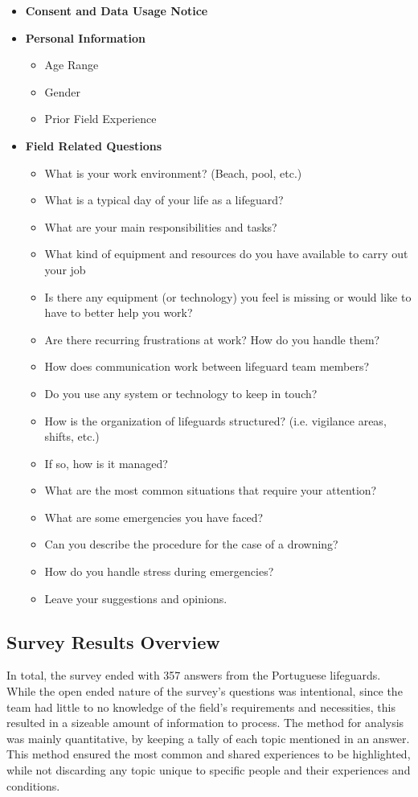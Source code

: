 \begin{itemize}
    \item \textbf{Consent and Data Usage Notice}
    \item \textbf{Personal Information}
    \begin{itemize}
        \item Age Range
        \item Gender
        \item Prior Field Experience
    \end{itemize}
    \newpage
    \item \textbf{Field Related Questions}
    \begin{itemize}
        \item What is your work environment? (Beach, pool, etc.)
        \item What is a typical day of your life as a lifeguard?
        \item What are your main responsibilities and tasks?
        \item What kind of equipment and resources do you have available to carry out your job 
        \item Is there any equipment (or technology) you feel is missing or would like to have to better help you work?
        \item Are there recurring frustrations at work? How do you handle them?
        \item How does communication work between lifeguard team members?
        \item Do you use any system or technology to keep in touch?
        \item How is the organization of lifeguards structured? (i.e. vigilance areas, shifts, etc.)
        \item If so, how is it managed?
        \item What are the most common situations that require your attention?
        \item What are some emergencies you have faced?
        \item Can you describe the procedure for the case of a drowning?
        \item How do you handle stress during emergencies?
        \item Leave your suggestions and opinions.
    \end{itemize}
\end{itemize}

\subsection{Survey Results Overview}
In total, the survey ended with 357 answers from the Portuguese lifeguards. 
While the open ended nature of the survey's questions was intentional, since the team had little to no knowledge of the field's requirements and necessities, this resulted in a sizeable amount of information to process. The method for analysis was mainly quantitative, by keeping a tally of each topic mentioned in an answer. This method ensured the most common and shared experiences to be highlighted, while not discarding any topic unique to specific people and their experiences and conditions.

